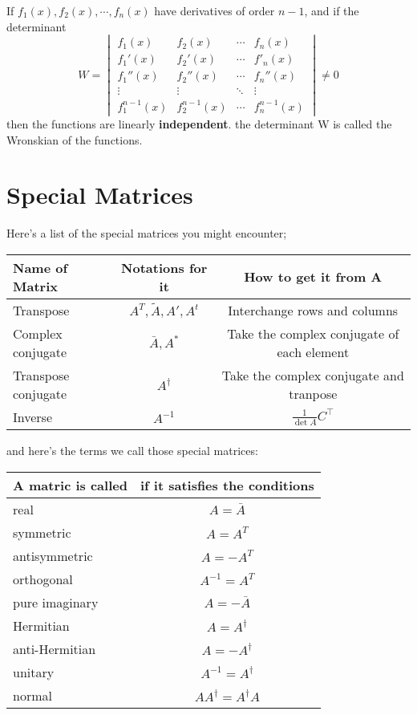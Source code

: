 \documentclass[oneside]{book}
\numberwithin{equation}{chapter} %
\begin{document}
If $f_1(x),f_2(x),\cdots,f_n(x)$ have derivatives of order $n-1$, and if the determinant 
\begin{equation}
	W=
	\begin{vmatrix}
		f_1(x)&f_2(x)&\cdots &f_n(x)\\
		f_1'(x)&f_2'(x)&\cdots&f'_n(x)\\
		f_1''(x)&f_2''(x)&\cdots&f_n''(x)\\
		\vdots&\vdots&\ddots&\vdots\\
		f_1^{n-1}(x)&f_2^{n-1}(x)&\cdots&f_n^{n-1}(x)
	\end{vmatrix}
\ne 0
\end{equation}
then the functions are linearly \textbf{independent}. the determinant W is called the Wronskian of the functions.

\section{Special Matrices}
Here's a list of the special matrices you might encounter;
\begin{table}[!hbt]
\centering
\begin{tabular}{|l|c|c|}
	\hline Name of Matrix 	&Notations for it 	&How to get it from A\\
	\hline	Transpose	& $A^T, \tilde{A}, A', A^t$& Interchange rows and columns \\
	\hline Complex conjugate & $\bar{A}, A^*$ & Take the complex conjugate of each element\\
	\hline Transpose conjugate & $A^\dagger$ & Take the complex conjugate and tranpose\\
	\hline Inverse & $A^{-1}$ & $\frac{1}{\det A}C^\intercal$\\
	\hline 
\end{tabular}
\end{table}
and here's the terms we call those special matrices:
\begin{table}[!hbt]
\centering
\begin{tabular}{|l|c|}
	\hline A matric is called &if it satisfies the conditions\\
	\hline real & $A=\bar A$\\
	\hline symmetric &$A=A^T$\\
	\hline antisymmetric & $A=-A^T$\\
	\hline orthogonal &$A^{-1}=A^T$\\
	\hline pure imaginary &$A=-\bar A$\\
	\hline Hermitian &$A=A^\dagger$\\
	\hline anti-Hermitian &$A=-A^\dagger$\\
	\hline unitary &$A^{-1}=A^\dagger$\\
	\hline normal &$AA^\dagger=A^\dagger A$\\
	\hline
\end{tabular}
\end{table}
\end{document}
